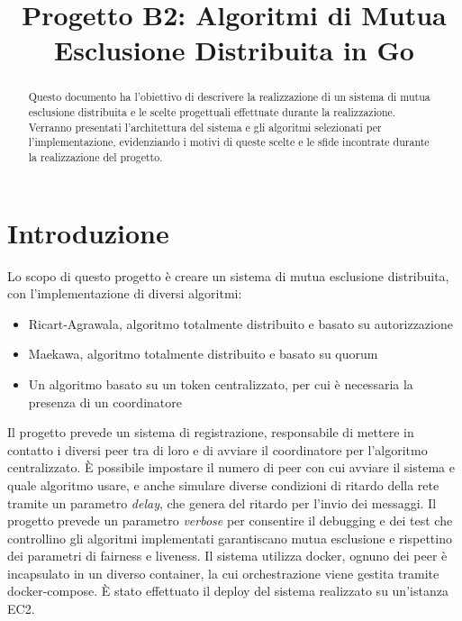 \documentclass[conference]{IEEEtran}
\begin{document}
\title{Progetto B2: Algoritmi di Mutua Esclusione Distribuita in Go\\}

\author{
}

\maketitle

\begin{abstract}
Questo documento ha l'obiettivo di descrivere la realizzazione di un sistema di mutua esclusione distribuita e le scelte progettuali effettuate durante la realizzazione.
Verranno presentati l'architettura del sistema e gli algoritmi selezionati per l'implementazione, evidenziando i motivi di queste scelte e le sfide incontrate durante la realizzazione del progetto. 
\end{abstract}


\section{Introduzione}
Lo scopo di questo progetto è creare un sistema di mutua esclusione distribuita, con l'implementazione di diversi algoritmi:
\begin{itemize}
\item Ricart-Agrawala, algoritmo totalmente distribuito e basato su autorizzazione
\item Maekawa, algoritmo totalmente distribuito e basato su quorum
\item Un algoritmo basato su un token centralizzato, per cui è necessaria la presenza di un coordinatore
\end{itemize}
Il progetto prevede un sistema di registrazione, responsabile di mettere in contatto i diversi peer tra di loro e di avviare il coordinatore per l'algoritmo centralizzato.
\`E possibile impostare il numero di peer con cui avviare il sistema e quale algoritmo usare, e anche simulare diverse condizioni di ritardo della rete tramite un parametro \textit{delay}, che genera del ritardo per l'invio dei messaggi.
Il progetto prevede un parametro \textit{verbose} per consentire il debugging e dei test che controllino gli algoritmi implementati garantiscano mutua esclusione e rispettino dei parametri di fairness e liveness. Il sistema utilizza docker, ognuno dei peer è incapsulato in un diverso container, la cui orchestrazione viene gestita tramite docker-compose. \`E stato effettuato il deploy del sistema realizzato su un'istanza EC2.
\end{document}

